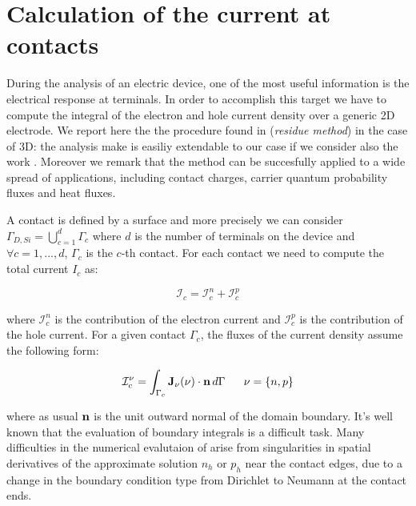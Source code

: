 \clearpage


\section{Calculation of the current at contacts}

During the analysis of an electric device, one of the most useful information is the electrical response at terminals. In order to accomplish this target we have to compute the integral of the electron and hole current density over a generic 2D electrode. We report here the the procedure found in \cite{ContactCurrentRM} (\textit{residue method}) in the case of 3D: the analysis make is easiliy extendable to our case if we consider also the work \cite{GalerkMethConsHughes}. Moreover we remark that the method can be succesfully applied to a wide spread of applications, including contact charges, carrier quantum probability fluxes and heat fluxes.

A contact is defined by a surface and more precisely we can consider $\Gamma_{D,Si} = \bigcup_{c=1}^d \Gamma_c$ where $d$ is the number of terminals on the device and $\forall c=1,...,d$, $\Gamma_c$ is the $c$-th contact. For each contact we need to compute the total current $I_c$ as:

\begin{equation}
\mathcal{I}_c = \mathcal{I}_c^n + \mathcal{I}_c^p
\end{equation}

where $\mathcal{I}_c^n$ is the contribution of the electron current and $\mathcal{I}_c^p$ is the contribution of the hole current.
For a given contact $\Gamma_c$, the fluxes of the current density assume the following form:

\begin{equation}
\label{eq: current flux}
\mathcal{I}_c^\nu = \int_{\Gamma_c}\vect{J}_\nu(\nu) \cdot \vect{n} \, d{\Gamma} \psp{10} \nu = \{n,p\}
\end{equation}

where as usual $\mathbf{n}$ is the unit outward normal of the domain boundary. It's well known that the evaluation of boundary integrals is a difficult task. Many difficulties in the numerical evalutaion of  arise from singularities in spatial derivatives of the approximate solution $n_h$ or $p_h$ near the contact edges, due to a change in the boundary condition type from Dirichlet to Neumann at the contact ends.



